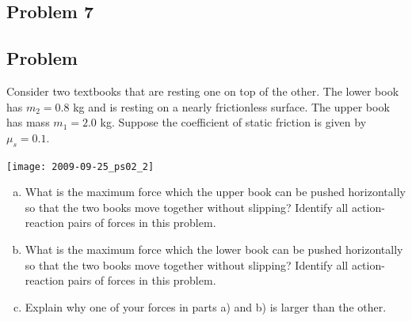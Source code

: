 \documentclass{esg8012pset}
\begin{document}
\begin{question}[Problem 2]
\section*{Problem 7}
\subsection*{Problem} Consider two textbooks that are resting one on top of the other. The lower book has $m_2 = 0.8$ kg and is resting on a nearly frictionless surface. The upper book has mass $m_1 = 2.0$ kg. Suppose the coefficient of static friction is given by $\mu_s = 0.1$.
\begin{center}\texttt{[image: 2009-09-25\_ps02\_2]}\end{center}
\begin{enumerate}[a)]
  \item What is the maximum force which the upper book can be pushed horizontally so that the two books move together without slipping? Identify all action-reaction pairs of forces in this problem.
  \item What is the maximum force which the lower book can be pushed horizontally so that the two books move together without slipping? Identify all action-reaction pairs of forces in this problem.
  \item Explain why one of your forces in parts a) and b) is larger than the other.
\end{enumerate}

\end{question}
\end{document}
